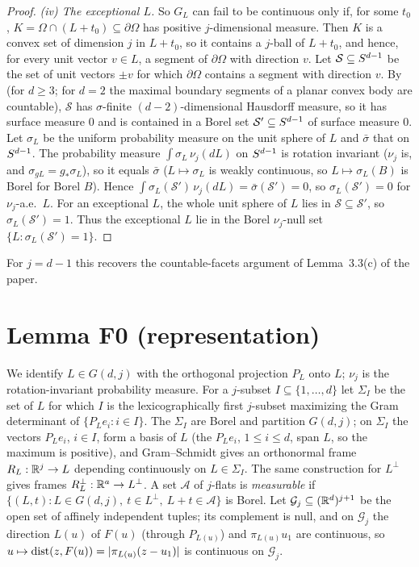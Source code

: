 \documentclass[11pt]{article}
\begin{document}
\begin{proof}
\emph{(iv) The exceptional $L$.} So $G_L$ can fail to be continuous only if, for some $t_0$, $K=\Omega\cap(L+t_0)\subseteq\partial\Omega$
has positive $j$-dimensional measure. Then $K$ is a convex set of dimension $j$ in $L+t_0$, so it contains a $j$-ball of
$L+t_0$, and hence, for every unit vector $v\in L$, a segment of $\partial\Omega$ with direction $v$. Let $\mathcal S\subseteq S^{d-1}$ be
the set of unit vectors $\pm v$ for which $\partial\Omega$ contains a segment with direction $v$. By \cite[Theorem~1]{ELR} (for
$d\ge3$; for $d=2$ the maximal boundary segments of a planar convex body are countable), $\mathcal S$ has $\sigma$-finite
$(d-2)$-dimensional Hausdorff measure, so it has surface measure $0$ and is contained in a Borel set $\mathcal S'\subseteq S^{d-1}$
of surface measure $0$. Let $\sigma_L$ be the uniform probability measure on the unit sphere of $L$ and $\bar\sigma$ that on
$S^{d-1}$. The probability measure $\int\sigma_L\,\nu_j(dL)$ on $S^{d-1}$ is rotation invariant ($\nu_j$ is, and $\sigma_{gL}=g_*\sigma_L$),
so it equals $\bar\sigma$ ($L\mapsto\sigma_L$ is weakly continuous, so $L\mapsto\sigma_L(B)$ is Borel for Borel $B$). Hence $\int\sigma_L(\mathcal S')\,\nu_j(dL)=\bar\sigma(\mathcal S')=0$, so $\sigma_L(\mathcal S')=0$ for $\nu_j$-a.e.\ $L$. For an
exceptional $L$, the whole unit sphere of $L$ lies in $\mathcal S\subseteq\mathcal S'$, so $\sigma_L(\mathcal S')=1$. Thus the exceptional
$L$ lie in the Borel $\nu_j$-null set $\{L:\sigma_L(\mathcal S')=1\}$.
\end{proof}

\noindent For $j=d-1$ this recovers the countable-facets argument of Lemma~3.3(c) of the paper.

\section*{Lemma F0 (representation)}

We identify $L\in G(d,j)$ with the orthogonal projection $P_L$ onto $L$; $\nu_j$ is the rotation-invariant probability measure.
For a $j$-subset $I\subseteq\{1,\dots,d\}$ let $\Sigma_I$ be the set of $L$ for which $I$ is the lexicographically first $j$-subset
maximizing the Gram determinant of $\{P_Le_i:i\in I\}$. The $\Sigma_I$ are Borel and partition $G(d,j)$; on $\Sigma_I$ the vectors
$P_Le_i$, $i\in I$, form a basis of $L$ (the $P_Le_i$, $1\le i\le d$, span $L$, so the maximum is positive), and Gram--Schmidt
gives an orthonormal frame $R_L:\mathbb{R}^j\to L$ depending continuously on $L\in\Sigma_I$. The same construction for $L^\perp$
gives frames $R^\perp_L:\mathbb{R}^a\to L^\perp$. A set $\mathcal A$ of $j$-flats is \emph{measurable} if
$\{(L,t):L\in G(d,j),\ t\in L^\perp,\ L+t\in\mathcal A\}$ is Borel. Let $\mathcal G_j\subseteq(\mathbb{R}^d)^{j+1}$ be the open set of affinely
independent tuples; its complement is null, and on $\mathcal G_j$ the direction $L(u)$ of $F(u)$ (through $P_{L(u)}$) and
$\pi_{L(u)}u_1$ are continuous, so $u\mapsto\operatorname{dist}(z,F(u))=|\pi_{L(u)}(z-u_1)|$ is continuous on $\mathcal G_j$.
\end{document}
